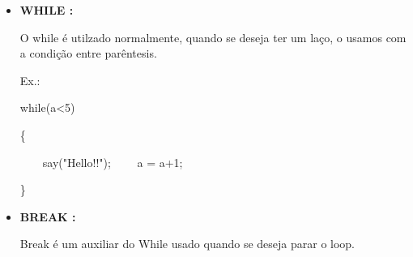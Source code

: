 \documentclass[a4paper]{article}
\begin{document}
{{{{{{{{{\begin{itemize}
            Para uma condição inicial, usamos
            \textcolor{NavyBlue}{if},
            para uma segunda condição, caso a 
            primeira não ocorra, usamos
            \textcolor{NavyBlue}{elsif}
            e quando nenhuma das ações ocorra
            usamos 
            \textcolor{NavyBlue}{else}.
            
            \textcolor{NavyBlue}{Ex.:}
            
            \textcolor{NavyBlue}{if(a>b)}
            
            \{
            
            \ \ \ \  say("a é maior");
            
            \}
            
            \textcolor{NavyBlue}{elsif(a == b)}
            
            \{
            
            \ \ \ \ say("a é igual a b");
            
            \}
            
            \textcolor{NavyBlue}{else}
            
            \{
            
            \ \ \ \  say("a é menor a b");
            
            \}
    
        \bigskip    
            
        \item \textbf{WHILE :}
            
            O while é utilzado normalmente, quando se
            deseja ter um laço, o usamos com a condição
            entre parêntesis.
        
            \textcolor{NavyBlue}{Ex.:}
            
            \textcolor{NavyBlue}{while(a<5)}
            
            \{
            
            \ \ \ \  say("Hello!!");
            \ \ \ \  a = a+1;
            
            \}
        
        \bigskip
            
        \item \textbf{BREAK :}
            
            Break é um auxiliar do While usado quando se 
            deseja parar o loop.
            

\end{itemize}}}}}}}}}}
\end{document}
